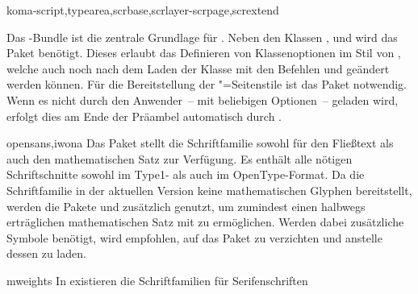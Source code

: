 \begin{packages}
\item[koma-script,typearea,scrbase,scrlayer-scrpage,scrextend]
  \begin{Declaration*}{}
  \begin{Declaration*}{}
  \begin{Declaration*}{}
  \begin{Declaration*}{}
  Das \KOMAScript-Bundle ist die zentrale Grundlage für \TUDScript. Neben den 
  Klassen ,  und  wird das Paket 
   benötigt. Dieses erlaubt das Definieren von Klassenoptionen 
  im Stil von \KOMAScript, welche auch noch nach dem Laden der Klasse mit den 
  Befehlen  und  geändert werden können. Für 
  die Bereitstellung der "=Seitenstile ist das Paket 
   notwendig. Wenn es nicht durch den Anwender~-- mit 
  beliebigen Optionen~-- geladen wird, erfolgt dies am Ende der Präambel 
  automatisch durch \TUDScript.
  \end{Declaration*}
  \end{Declaration*}
  \end{Declaration*}
  \end{Declaration*}
\item[opensans,iwona]
  Das Paket  stellt die Schriftfamilie \OpenSans sowohl für 
  den Fließtext als auch den mathematischen Satz zur Verfügung. Es enthält alle 
  nötigen Schriftschnitte sowohl im Type1- als auch im OpenType-Format. Da die 
  Schriftfamilie in der aktuellen Version keine mathematischen Glyphen 
  bereitstellt, werden die Pakete  und  
  zusätzlich genutzt, um zumindest einen halbwegs erträglichen mathematischen 
  Satz mit \OpenSans zu ermöglichen. Werden dabei zusätzliche Symbole benötigt, 
  wird empfohlen, auf das Paket  zu verzichten und anstelle 
  dessen  zu laden.
\item[mweights]
  In  existieren die Schriftfamilien für Serifenschriften 

\end{packages}
